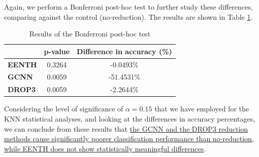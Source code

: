 Again, we perform a Bonferroni post-hoc test to further study these differences, comparing against the control (no-reduction). The results are shown in Table \ref{tab:knn:mush:red-posthoc}.
\begin{table}[h!]
    \centering
    \small
    \begin{tabular}{|l|c|c|}
    \hline
                             & \textbf{p-value} & \textbf{Difference in accuracy (\%)} \\ \hline
    \textbf{EENTH} & 0.3264           & -0.0493\%          \\ \hline
    \textbf{GCNN}           & 0.0059           & -51.4531\%          \\ \hline
    \textbf{DROP3}           & 0.0059           & -2.2644\%          \\ \hline
    \end{tabular}
    \caption{Results of the Bonferroni post-hoc test}
    \label{tab:knn:mush:red-posthoc}
\end{table}

Considering the level of significance of $ \alpha = 0.15 $ that we have employed for the KNN statistical analyses, and looking at the differences in accuracy percentages, we can conclude from these results that \uline{the GCNN and the DROP3 reduction methods cause significantly poorer classification performance than no-reduction, while EENTH does not show statistically meaningful differences}.

